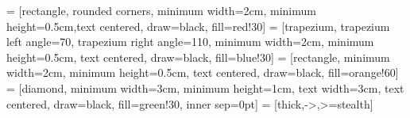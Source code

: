  = [rectangle, rounded corners, minimum width=2cm, minimum height=0.5cm,text centered, draw=black, fill=red!30]
 = [trapezium, trapezium left angle=70, trapezium right angle=110, minimum width=2cm, minimum height=0.5cm, text centered, draw=black, fill=blue!30]
 = [rectangle, minimum width=2cm, minimum height=0.5cm, text centered, draw=black, fill=orange!60]
 = [diamond, minimum width=3cm, minimum height=1cm, text width=3cm, text centered, draw=black, fill=green!30,   inner sep=0pt]
 = [thick,->,>=stealth]
